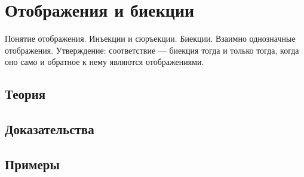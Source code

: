
\section{Отображения и биекции}
\label{sec:2.2.03-mappings-bijections}

\begin{ticket}
Понятие отображения. Инъекции и сюръекции. Биекции. Взаимно однозначные отображения. Утверждение: соответствие — биекция тогда и только тогда, когда оно само и обратное к нему являются отображениями.
\end{ticket}

\subsection*{Теория}

\subsection*{Доказательства}

\subsection*{Примеры}
